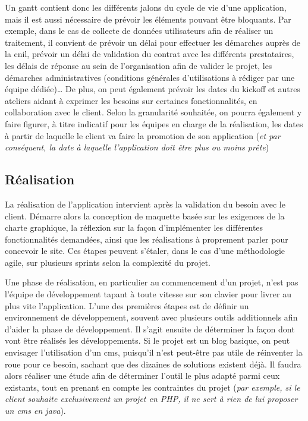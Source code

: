 Un \gls{gantt} contient donc les différents jalons du cycle de vie d'une application, mais il est aussi nécessaire de prévoir les éléments pouvant être bloquants. Par exemple, dans le cas de collecte de données utilisateurs afin de réaliser un traitement, il convient de prévoir un délai pour effectuer les démarches auprès de la \gls{cnil}, prévoir un délai de validation du contrat avec les différents prestataires, les délais de réponse au sein de l'organisation afin de valider le projet, les démarches administratives (conditions générales d'utilisations à rédiger par une équipe dédiée)\ldots{} De plus, on peut également prévoir les dates du \gls{kickoff} et autres ateliers aidant à exprimer les besoins sur certaines fonctionnalités, en collaboration avec le client. Selon la granularité souhaitée, on pourra également y faire figurer, à titre indicatif pour les équipes en charge de la réalisation, les dates à partir de laquelle le client va faire la promotion de son application (\emph{et par conséquent, la date à laquelle l'application doit être plus ou moins prête})

\subsection{Réalisation}

La réalisation de l'application intervient après la validation du besoin avec le client. Démarre alors la conception de maquette basée sur les exigences de la charte graphique, la réflexion sur la façon d'implémenter les différentes fonctionnalités demandées, ainsi que les réalisations à proprement parler pour concevoir le site. Ces étapes peuvent s'étaler, dans le cas d'une méthodologie agile, sur plusieurs sprints selon la complexité du projet.

Une phase de réalisation, en particulier au commencement d'un projet, n'est pas l'équipe de développement tapant à toute vitesse sur son clavier pour livrer au plus vite l'application. L'une des premières étapes est de définir un environnement de développement, souvent avec plusieurs outils additionnels afin d'aider la phase de développement. Il s'agit ensuite de déterminer la façon dont vont être réalisés les développements. Si le projet est un blog basique, on peut envisager l'utilisation d'un \gls{cms}, puisqu'il n'est peut-être pas utile de réinventer la roue pour ce besoin, sachant que des dizaines de solutions existent déjà. Il faudra alors réaliser une étude afin de déterminer l'outil le plus adapté parmi ceux existants, tout en prenant en compte les contraintes du projet (\emph{par exemple, si le client souhaite exclusivement un projet en \gls{PHP}, il ne sert à rien de lui proposer un \gls{cms} en java}).


